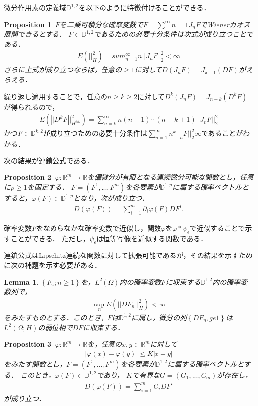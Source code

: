 \documentclass[a4paper,10pt]{jsarticle}
\theoremstyle{plain}
\newtheorem{lemma}{Lemma}
\newtheorem{proposition}{Proposition}
\newcommand{\eq}[1]{\begin{align}#1\end{align}}
\begin{document}
微分作用素の定義域$\mathbb{D}^{1,2}$を以下のように特徴付けることができる．
\begin{proposition}\label{prop1.2.2}
$F$を二乗可積分な確率変数で$F=\sum^\infty{n=1}J_nF$でWienerカオス展開できるとする．
$F\in\mathbb{D}^{1,2}$であるための必要十分条件は次式が成り立つことである．
\eq{E\left(||^2_H\right)=sum^\infty_{n=1}n||J_nF||^2_2<\infty}
さらに上式が成り立つならば，任意の$\ge1$に対して$D(J_nF)=J_{n-1}(DF)$がえらえる．
\end{proposition}
繰り返し適用することで，任意の$n\ge k\ge2$に対して$D^k(J_nF)=J_{n-k}(D^kF)$が得られるので，
\eq{E\left(\left||D^kF\right||^2_{H^{\otimes k}}\right)=\sum^\infty_{n=k}n(n-1)\cdots(n-k+1)||J_nF||^2_2}
かつ$F\in\mathbb{D}^{k,2}$が成り立つための必要十分条件は$\sum^\infty_{n=1}n^k||_nF||^2_2\infty$であることがわかる．

次の結果が連鎖公式である．
\begin{proposition}\label{prop1.2.3}
$\varphi:\mathbb{R}^m\rightarrow\mathbb{R}$を偏微分が有限となる連続微分可能な関数とし，任意に$p\ge1$を固定する．
$F=\left(F^1,...,F^m\right)$を各要素が$\mathbb{D}^{1,p}$に属する確率ベクトルとすると，$\varphi(F)\in\mathbb{D}^{1,p}$となり，次が成り立つ．
\eq{D\left(\varphi(F)\right)=\sum^m_{i=1}\partial_i\varphi(F)DF^i.}
\end{proposition}
確率変数$F$をなめらなかな確率変数で近似し，関数$\varphi$を$\varphi*\psi_\epsilon$で近似することで示すことができる．
ただし，$\psi_\epsilon$は恒等写像を近似する関数である．

連鎖公式はLipschitz連続な関数に対して拡張可能であるが，その結果を示すために次の補題を示す必要がある．
\begin{lemma}\label{lem1.2.3}
$\left\{F_n;n\ge1\right\}$を，$L^2(\Omega)$内の確率変数$F$に収束する$\mathbb{D}^{1,2}$内の確率変数列で，
\eq{\sup_nE\left(||DF_n||^2_H\right)<\infty}
をみたすものとする．このとき，$F$は$\mathbb{D}^{1,2}$に属し，微分の列$\left\{DF_n,ge1\right\}$は$L^2(\Omega;H)$の弱位相で$DF$に収束する．
\end{lemma}
\begin{proposition}\label{prop1.2.4}
$\varphi:\mathbb{R}^m\rightarrow\mathbb{R}$を，任意の$x,y\in\mathbb{R}^m$に対して
\eq{|\varphi(x)-\varphi(y)|\le K|x-y|}
をみたす関数とし，$F=(F^1,...,F^m)$を各要素が$\mathbb{D}^{1,2}$に属する確率ベクトルとする．
このとき，$\varphi(F)\in\mathbb{D}^{1,2}$であり，
$K$で有界な$G=(G_1,...,G_m)$が存在し，
\eq{D\left(\varphi(F)\right)=\sum^m_{i=1}G_iDF^i\label{N1.35}}
が成り立つ．
\end{proposition}
\end{document}
